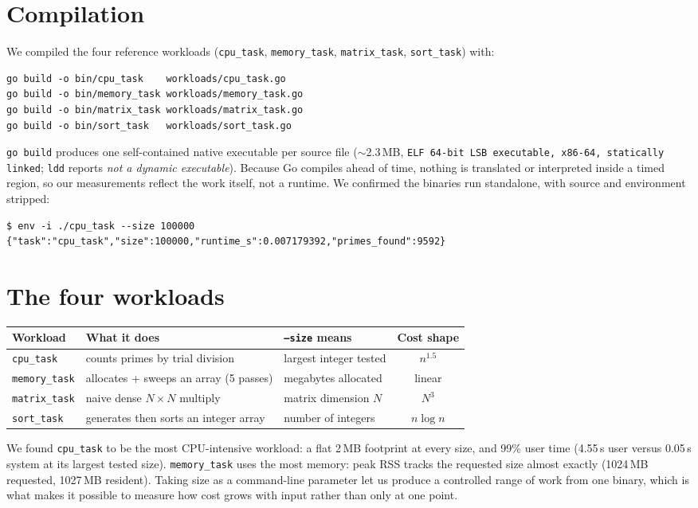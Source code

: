 \documentclass[11pt]{article}
\newcommand{\code}[1]{\texttt{#1}}
\begin{document}
\section{Compilation}
We compiled the four reference workloads (\code{cpu\_task}, \code{memory\_task},
\code{matrix\_task}, \code{sort\_task}) with:
\begin{verbatim}
go build -o bin/cpu_task    workloads/cpu_task.go
go build -o bin/memory_task workloads/memory_task.go
go build -o bin/matrix_task workloads/matrix_task.go
go build -o bin/sort_task   workloads/sort_task.go
\end{verbatim}

\code{go build} produces one self-contained native executable per source file ($\sim$2.3\,MB,
\code{ELF 64-bit LSB executable, x86-64, statically linked}; \code{ldd} reports \emph{not a
dynamic executable}). Because Go compiles ahead of time, nothing is translated or interpreted
inside a timed region, so our measurements reflect the work itself, not a runtime. We confirmed the
binaries run standalone, with source and environment stripped:
\begin{verbatim}
$ env -i ./cpu_task --size 100000
{"task":"cpu_task","size":100000,"runtime_s":0.007179392,"primes_found":9592}
\end{verbatim}

\section{The four workloads}
\begin{center}
\begin{tabular}{lllc}
\toprule
Workload & What it does & \code{--size} means & Cost shape \\
\midrule
\code{cpu\_task} & counts primes by trial division & largest integer tested & $n^{1.5}$ \\
\code{memory\_task} & allocates + sweeps an array (5 passes) & megabytes allocated & linear \\
\code{matrix\_task} & naive dense $N \times N$ multiply & matrix dimension $N$ & $N^3$ \\
\code{sort\_task} & generates then sorts an integer array & number of integers & $n\log n$ \\
\bottomrule
\end{tabular}
\end{center}

We found \code{cpu\_task} to be the most CPU-intensive workload: a flat 2\,MB footprint at every
size, and 99\% user time (4.55\,s user versus 0.05\,s system at its largest tested size).
\code{memory\_task} uses the most memory: peak RSS tracks the requested size almost exactly
(1024\,MB requested, 1027\,MB resident). Taking size as a command-line parameter let us produce a
controlled range of work from one binary, which is what makes it possible to measure how cost grows
with input rather than only at one point.
\end{document}
